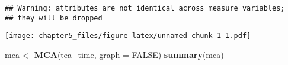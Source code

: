 \documentclass[]{article}
\newenvironment{Shaded}{\begin{snugshade}}{\end{snugshade}}
\newcommand{\DataTypeTok}[1]{\textcolor[rgb]{0.13,0.29,0.53}{#1}}
\newcommand{\DecValTok}[1]{\textcolor[rgb]{0.00,0.00,0.81}{#1}}
\newcommand{\KeywordTok}[1]{\textcolor[rgb]{0.13,0.29,0.53}{\textbf{#1}}}
\newcommand{\NormalTok}[1]{#1}
\newcommand{\OperatorTok}[1]{\textcolor[rgb]{0.81,0.36,0.00}{\textbf{#1}}}
\newcommand{\OtherTok}[1]{\textcolor[rgb]{0.56,0.35,0.01}{#1}}
\newcommand{\StringTok}[1]{\textcolor[rgb]{0.31,0.60,0.02}{#1}}
\begin{document}
\begin{Shaded}
\end{Shaded}

\begin{verbatim}
## Warning: attributes are not identical across measure variables;
## they will be dropped
\end{verbatim}

\texttt{[image: chapter5\_files/figure-latex/unnamed-chunk-1-1.pdf]}

\begin{Shaded}
\begin{Highlighting}[]
\NormalTok{mca <-}\StringTok{ }\KeywordTok{MCA}\NormalTok{(tea_time, }\DataTypeTok{graph =} \OtherTok{FALSE}\NormalTok{)}
\KeywordTok{summary}\NormalTok{(mca)}
\end{Highlighting}
\end{Shaded}
\end{document}
